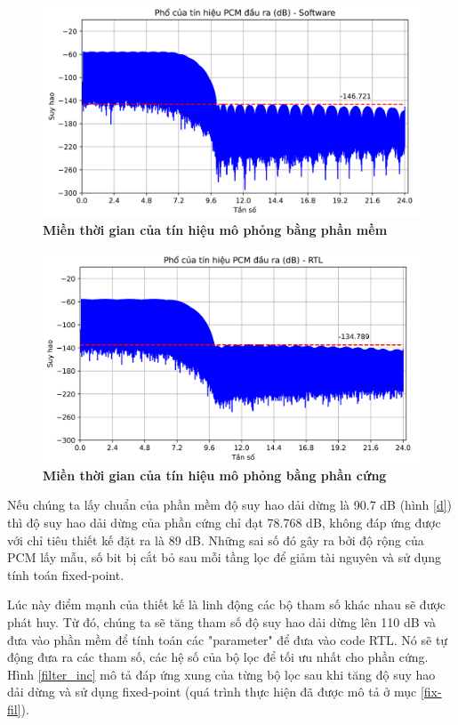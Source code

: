 \begin{figure}[H]
    \centering
    \includegraphics[width=12cm]{Images/Chuong4/tb/sim/sin_1_psd.png}
    \caption[Miền thời gian của tín hiệu mô phỏng bằng phần mềm]{\bfseries \fontsize{12pt}{0pt}\selectfont Miền thời gian của tín hiệu mô phỏng bằng phần mềm}
    \label{sin_1_psd}
\end{figure}

\begin{figure}[H]
    \centering
    \includegraphics[width=12cm]{Images/Chuong4/tb/sim/sin_1_psd_h.png}
    \caption[Miền thời gian của tín hiệu mô phỏng bằng phần cứng]{\bfseries \fontsize{12pt}{0pt}\selectfont Miền thời gian của tín hiệu mô phỏng bằng phần cứng}
    \label{sin_1_psd_h}
\end{figure}
Nếu chúng ta lấy chuẩn của phần mềm độ suy hao dải dừng là 90.7 dB (hình \ref{d}) thì độ suy hao dải dừng của phần cứng chỉ đạt 78.768 dB, không đáp ứng được với chỉ tiêu thiết kế đặt ra là 89 dB. Những sai số đó gây ra bởi độ rộng của PCM lấy mẫu, số bit bị cắt bỏ sau mỗi tầng lọc để giảm tài nguyên và sử dụng tính toán fixed-point.

Lúc này điểm mạnh của thiết kế là linh động các bộ tham số khác nhau sẽ được phát huy. Từ đó, chúng ta sẽ tăng tham số độ suy hao dải dừng lên 110 dB và đưa vào phần mềm để tính toán các "parameter" để đưa vào code RTL. Nó sẽ tự động đưa ra các tham số, các hệ số của bộ lọc để tối ưu nhất cho phần cứng. Hình \ref{filter_inc} mô tả đáp ứng xung của từng bộ lọc sau khi tăng độ suy hao dải dừng và sử dụng fixed-point (quá trình thực hiện đã được mô tả ở mục \ref{fix-fil}).

